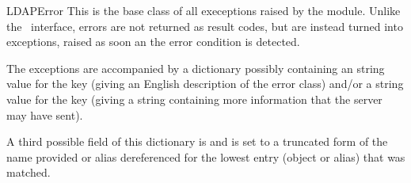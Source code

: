\begin{excdesc}{LDAPError}
This is the base class of all execeptions raised by the module.
Unlike the \C\ interface, errors are not returned as result codes, but
are instead turned into exceptions, raised as soon an the error condition 
is detected.

The exceptions are accompanied by a dictionary possibly
containing an string value for the key  
(giving an English description of the error class)
and/or a string value for the key 
(giving a string containing more information that the server may have sent).

A third possible field of this dictionary is  and
is set to a truncated form of the name provided or alias dereferenced
for the lowest entry (object or alias) that was matched.

\end{excdesc}

